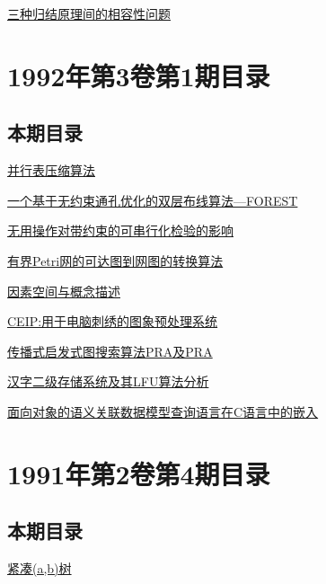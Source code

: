 \documentclass[a4paper]{article}
\begin{document}
\href{http://www.jos.org.cn/ch/reader/download_pdf.aspx?file_no=19920209&year_id=1992&quarter_id=2&falg=1}{三种归结原理间的相容性问题}


\section{\textbf{1992年第3卷第1期目录}}
\subsection{本期目录}
\href{http://www.jos.org.cn/ch/reader/download_pdf.aspx?file_no=19920101&year_id=1992&quarter_id=1&falg=1}{并行表压缩算法}

\href{http://www.jos.org.cn/ch/reader/download_pdf.aspx?file_no=19920102&year_id=1992&quarter_id=1&falg=1}{一个基于无约束通孔优化的双层布线算法—FOREST}

\href{http://www.jos.org.cn/ch/reader/download_pdf.aspx?file_no=19920103&year_id=1992&quarter_id=1&falg=1}{无用操作对带约束的可串行化检验的影响}

\href{http://www.jos.org.cn/ch/reader/download_pdf.aspx?file_no=19920104&year_id=1992&quarter_id=1&falg=1}{有界Petri网的可达图到网图的转换算法}

\href{http://www.jos.org.cn/ch/reader/download_pdf.aspx?file_no=19920105&year_id=1992&quarter_id=1&falg=1}{因素空间与概念描述}

\href{http://www.jos.org.cn/ch/reader/download_pdf.aspx?file_no=19920106&year_id=1992&quarter_id=1&falg=1}{CEIP:用于电脑刺绣的图象预处理系统}

\href{http://www.jos.org.cn/ch/reader/download_pdf.aspx?file_no=19920107&year_id=1992&quarter_id=1&falg=1}{传播式启发式图搜索算法PRA及PRA}

\href{http://www.jos.org.cn/ch/reader/download_pdf.aspx?file_no=19920108&year_id=1992&quarter_id=1&falg=1}{汉字二级存储系统及其LFU算法分析}

\href{http://www.jos.org.cn/ch/reader/download_pdf.aspx?file_no=19920109&year_id=1992&quarter_id=1&falg=1}{面向对象的语义关联数据模型查询语言在C语言中的嵌入}


\section{\textbf{1991年第2卷第4期目录}}
\subsection{本期目录}
\href{http://www.jos.org.cn/ch/reader/download_pdf.aspx?file_no=19910401&year_id=1991&quarter_id=4&falg=1}{紧凑(a,b)树}
\end{document}
